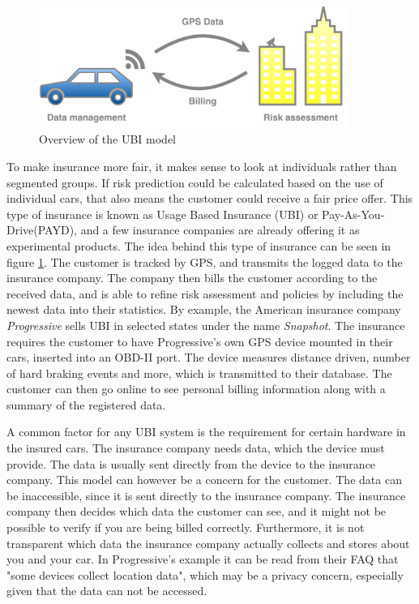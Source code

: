 \begin{figure}[tb]
\centering
\includegraphics[width=0.9\textwidth]{Pictures/Overview}
\caption{Overview of the UBI model}
\label{fig:overview}
\end{figure}

To make insurance more fair, it makes sense to look at individuals rather than segmented groups. If risk prediction could be calculated based on the use of individual cars, that also means the customer could receive a fair price offer. This type of insurance is known as Usage Based Insurance (UBI) or Pay-As-You-Drive(PAYD), and a few insurance companies are already offering it as experimental products. The idea behind this type of insurance can be seen in figure \ref{fig:overview}. The customer is tracked by GPS, and transmits the logged data to the insurance company. The company then bills the customer according to the received data, and is able to refine risk assessment and policies by including the newest data into their statistics.
By example, the American insurance company \textit{Progressive} sells UBI in selected states under the name \textit{Snapshot}\cite{snapshot}. The insurance requires the customer to have Progressive's own GPS device mounted in their cars, inserted into an OBD-II port. The device measures distance driven, number of hard braking events and more, which is transmitted to their database. The customer can then go online to see personal billing information along with a summary of the registered data.

A common factor for any UBI system is the requirement for certain hardware in the insured cars. The insurance company needs data, which the device must provide. The data is usually sent directly from the device to the insurance company. This model can however be a concern for the customer. The data can be inaccessible, since it is sent directly to the insurance company. The insurance company then decides which data the customer can see, and it might not be possible to verify if you are being billed correctly. Furthermore, it is not transparent which data the insurance company actually collects and stores about you and your car. In Progressive's example it can be read from their FAQ that "some devices collect location data", which may be a privacy concern, especially given that the data can not be accessed.


